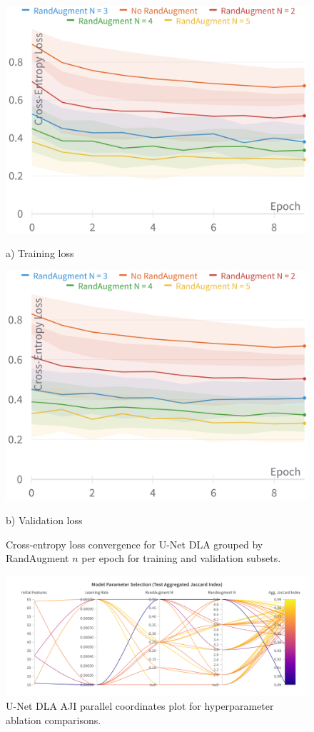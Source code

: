 \begin{figure}[h]
    \centering
    \includegraphics[width=0.7\linewidth]{figures/train_loss.png}
    \caption*{a) Training loss}
    \vspace{0.8em}
    \includegraphics[width=0.7\linewidth]{figures/val_loss.png}
    \caption*{b) Validation loss}
    \caption{Cross-entropy loss convergence for U-Net DLA grouped by RandAugment $n$ per epoch for training and validation subsets.}
    \label{fig:loss-convergence}
\end{figure}

\begin{figure}[h]
    \centering
    \includegraphics*[width=\textwidth]{figures/parameter_selection.png}
    \caption{U-Net DLA AJI parallel coordinates plot for hyperparameter ablation comparisons.}
    \label{fig:parameter-selection}
\end{figure}

